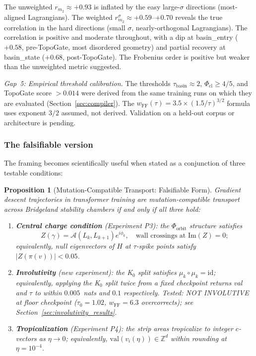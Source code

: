 \documentclass[11pt]{amsart}
\newtheorem{proposition}[theorem]{Proposition}
\begin{document}
The unweighted $r_{m_2} \approx +0.93$ is inflated by the easy
large-$\sigma$ directions (most-aligned Lagrangians).
The weighted $r_{m_2}^\sigma \approx +0.59$--$+0.70$ reveals the
true correlation in the hard directions (small $\sigma$, nearly-orthogonal
Lagrangians).
The correlation is positive and moderate throughout, with a dip at
basin\_entry ($+0.58$, pre-TopoGate, most disordered geometry) and
partial recovery at basin\_state ($+0.68$, post-TopoGate).
The Frobenius order is positive but weaker than the unweighted metric suggested.

\emph{Gap~5: Empirical threshold calibration.}
The thresholds $\tau_\mathrm{basin} \approx 2$,
$\Phi_\mathrm{cl} \geq 4/5$, and TopoGate score $> 0.014$
were derived from the same training runs on which they are evaluated
(Section~\ref{sec:compiler}).
The $w_\mathrm{FF}(\tau) = 3.5 \times (1.5/\tau)^{3/2}$ formula uses
exponent $3/2$ assumed, not derived.
Validation on a held-out corpus or architecture is pending.

\subsubsection*{The falsifiable version}

The framing becomes scientifically useful when stated as a conjunction
of three testable conditions:

\begin{proposition}[Mutation-Compatible Transport: Falsifiable Form]
\label{prop:falsifiable}
Gradient descent trajectories in transformer training are
mutation-compatible transport across Bridgeland stability chambers
if and only if all three hold:
\begin{enumerate}
\item \textbf{Central charge condition} (Experiment P3):
  the $\Phi_\mathrm{orbit}$ structure satisfies
  \[
    Z(\gamma) = \mathcal{A}(L_k, L_{k+1})e^{i\phi_k},
    \quad \text{wall crossings at } \mathrm{Im}(Z) = 0;
  \]
  equivalently, null eigenvectors of $H$ at $\tau$-spike points
  satisfy $|Z(\pi(v))| < 0.05$.
\item \textbf{Involutivity} (new experiment):
  the K$_0$ split satisfies $\mu_k \circ \mu_k = \mathrm{id}$;
  equivalently, applying the K$_0$ split twice from a fixed checkpoint
  returns val and $\tau$ to within $0.005$~nats and $0.1$
  respectively.
  \emph{Tested}: NOT INVOLUTIVE at floor checkpoint
  ($\tau_0=1.02$, $w_\mathrm{FF}=6.3$ overcorrects);
  see Section~\ref{sec:involutivity_results}.
\item \textbf{Tropicalization} (Experiment P4):
  the strip areas tropicalize to integer $c$-vectors as $\eta \to 0$;
  equivalently, $\mathrm{val}(v_i(\eta)) \in \mathbb{Z}^d$ within
  rounding at $\eta = 10^{-4}$.
\end{enumerate}
\end{proposition}
\end{document}
